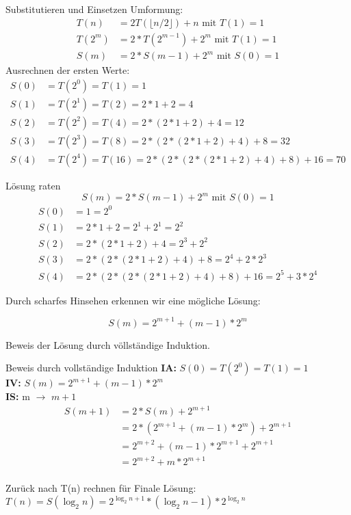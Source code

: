 \begin{frame}{Substitutieren und Einsetzen}
	Umformung:
	\begin{align*}
		T(n) &= 2 T(\lfloor n / 2 \rfloor) + n \text{ mit } T(1) = 1\\
		T(2^m) &= 2* T(2^{m - 1}) + 2^m \text{ mit } T(1) = 1\\
		S(m) &= 2 * S(m-1) + 2^m \text{ mit } S(0) = 1
	\end{align*}
	Ausrechnen der ersten Werte:
	\begin{align*}
		S(0) &= T(2^0) = T(1)  = 1\\
		S(1) &= T(2^1) = T(2)  = 2 * 1 + 2 = 4\\
		S(2) &= T(2^2) = T(4)  = 2 * (2 * 1 + 2) + 4 = 12\\
		S(3) &= T(2^3) = T(8)  = 2 * (2 * (2 * 1 + 2) + 4 ) + 8 = 32\\
		S(4) &= T(2^4) = T(16) = 2 * ( 2 * (2 * (2 * 1 + 2) + 4 ) + 8 ) + 16 = 70
	\end{align*}
\end{frame}

\begin{frame}{Lösung raten}
	\[
		S(m) = 2 * S(m-1) + 2^m \text{ mit } S(0) = 1
	\]
	\begin{align*}
		S(0) &= 1 = 2^0\\
		S(1) &= 2 * 1 + 2 = 2^1 + 2^1 = 2^2\\
		S(2) &= 2 * (2 * 1 + 2) + 4 = 2^3 + 2^2\\
		S(3) &= 2 * (2 * (2 * 1 + 2) + 4 ) + 8 = 2^4 + 2 * 2^3\\
		S(4) &= 2 * ( 2 * (2 * (2 * 1 + 2) + 4 ) + 8 ) + 16 = 2^5 + 3 * 2^4
	\end{align*}

	Durch scharfes Hinsehen erkennen wir eine mögliche Lösung:

	$$S(m) = 2^{m+1} + (m-1) * 2^{m}$$

	Beweis der Lösung durch völlständige Induktion.
\end{frame}

\begin{frame}{Beweis durch vollständige Induktion}
	\textbf{IA:} $S(0) = T(2^0) = T(1) = 1$ \\
	\textbf{IV:} $S(m) = 2^{m+1} + (m - 1)*2^{m}$\\
	\textbf{IS:} m $\rightarrow$ $m+1$
	\begin{align}
		S(m+1)& = 2 * S(m) + 2^{m+1} \\
		& = 2 * ( 2^{m+1} + (m-1) * 2^m) + 2^{m+1} \\
		& = 2^{m+2} + (m-1) * 2^{m+1} + 2^{m+1} \\
		& = 2^{m+2} + m * 2^{m+1}
	\end{align}
	\ \\
	Zurück nach T(n) rechnen für Finale Lösung: \\
	$T(n) = S(\log _2 n) = 2^{\log _2 n + 1} * (\log _2 n - 1) * 2 ^{\log _2 n}$
\end{frame}

